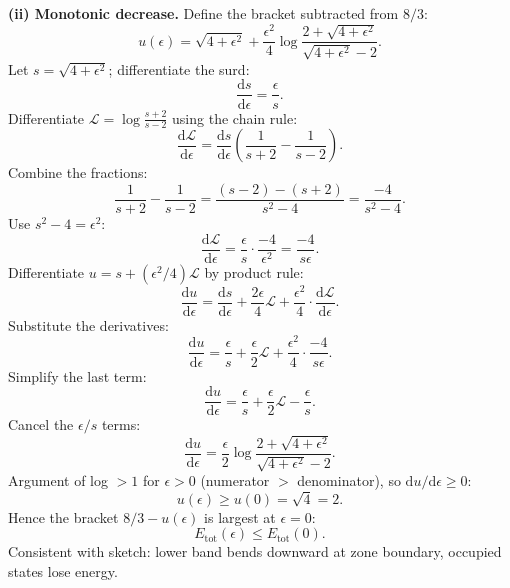 \documentclass[11pt]{article}
\newcommand{\de}{\mathrm{d}}
\begin{document}
\textbf{(ii) Monotonic decrease.} Define the bracket subtracted from $8/3$:
\[ u(\epsilon)=\sqrt{4+\epsilon^2}+\frac{\epsilon^2}{4}\log\!\frac{2+\sqrt{4+\epsilon^2}}{\sqrt{4+\epsilon^2}-2}. \]
Let $s=\sqrt{4+\epsilon^2}$; differentiate the surd:
\[ \frac{\de s}{\de\epsilon}=\frac{\epsilon}{s}. \]
Differentiate $\mathcal{L}=\log\!\tfrac{s+2}{s-2}$ using the chain rule:
\[ \frac{\de\mathcal{L}}{\de\epsilon}=\frac{\de s}{\de\epsilon}\!\left(\frac{1}{s+2}-\frac{1}{s-2}\right). \]
Combine the fractions:
\[ \frac{1}{s+2}-\frac{1}{s-2}=\frac{(s-2)-(s+2)}{s^2-4}=\frac{-4}{s^2-4}. \]
Use $s^2-4=\epsilon^2$:
\[ \frac{\de\mathcal{L}}{\de\epsilon}=\frac{\epsilon}{s}\cdot\frac{-4}{\epsilon^2}=\frac{-4}{s\epsilon}. \]
Differentiate $u=s+(\epsilon^2/4)\mathcal{L}$ by product rule:
\[ \frac{\de u}{\de\epsilon}=\frac{\de s}{\de\epsilon}+\frac{2\epsilon}{4}\mathcal{L}+\frac{\epsilon^2}{4}\cdot\frac{\de\mathcal{L}}{\de\epsilon}. \]
Substitute the derivatives:
\[ \frac{\de u}{\de\epsilon}=\frac{\epsilon}{s}+\frac{\epsilon}{2}\mathcal{L}+\frac{\epsilon^2}{4}\cdot\frac{-4}{s\epsilon}. \]
Simplify the last term:
\[ \frac{\de u}{\de\epsilon}=\frac{\epsilon}{s}+\frac{\epsilon}{2}\mathcal{L}-\frac{\epsilon}{s}. \]
Cancel the $\epsilon/s$ terms:
\[ \frac{\de u}{\de\epsilon}=\frac{\epsilon}{2}\log\!\frac{2+\sqrt{4+\epsilon^2}}{\sqrt{4+\epsilon^2}-2}. \]
Argument of log $>1$ for $\epsilon>0$ (numerator $>$ denominator), so $\de u/\de\epsilon\ge 0$:
\[ u(\epsilon)\ge u(0)=\sqrt{4}=2. \]
Hence the bracket $8/3-u(\epsilon)$ is largest at $\epsilon=0$:
\[ E_{\text{tot}}(\epsilon)\le E_{\text{tot}}(0). \]
Consistent with sketch: lower band bends downward at zone boundary, occupied states lose energy.
\end{document}
